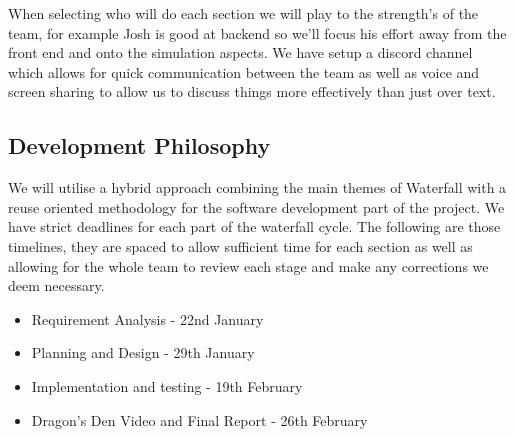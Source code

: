 \documentclass{article}
\begin{document}
When selecting who will do each section we will play to the strength's of the 
team, for example Josh is good at backend so we'll focus his effort away from 
the front end and onto the simulation aspects. We have setup a discord channel which 
allows for quick communication between the team as well as voice and screen sharing 
to allow us to discuss things more effectively than just over text.

\subsection{Development Philosophy}
We will utilise a hybrid approach combining the main themes of Waterfall with a 
reuse oriented methodology for the software development part of the project. We 
have strict deadlines for each part of the waterfall cycle. The following are 
those timelines, they are spaced to allow sufficient time for each section as 
well as allowing for the whole team to review each stage and make any corrections 
we deem necessary. 

\begin{itemize}
  \item Requirement Analysis
        - 22nd January
  \item Planning and Design
        - 29th January
  \item Implementation and testing
        - 19th February
  \item Dragon's Den Video and Final Report
        - 26th February
\end{itemize}
\end{document}
